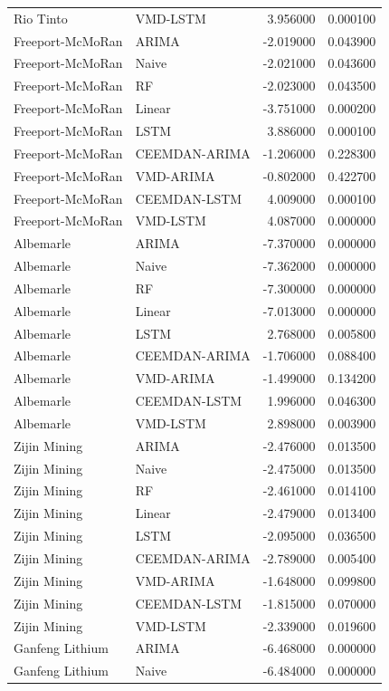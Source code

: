 \begin{longtable}{llrr}
Rio Tinto & VMD-LSTM & 3.956000 & 0.000100 \\
Freeport-McMoRan & ARIMA & -2.019000 & 0.043900 \\
Freeport-McMoRan & Naive & -2.021000 & 0.043600 \\
Freeport-McMoRan & RF & -2.023000 & 0.043500 \\
Freeport-McMoRan & Linear & -3.751000 & 0.000200 \\
Freeport-McMoRan & LSTM & 3.886000 & 0.000100 \\
Freeport-McMoRan & CEEMDAN-ARIMA & -1.206000 & 0.228300 \\
Freeport-McMoRan & VMD-ARIMA & -0.802000 & 0.422700 \\
Freeport-McMoRan & CEEMDAN-LSTM & 4.009000 & 0.000100 \\
Freeport-McMoRan & VMD-LSTM & 4.087000 & 0.000000 \\
Albemarle & ARIMA & -7.370000 & 0.000000 \\
Albemarle & Naive & -7.362000 & 0.000000 \\
Albemarle & RF & -7.300000 & 0.000000 \\
Albemarle & Linear & -7.013000 & 0.000000 \\
Albemarle & LSTM & 2.768000 & 0.005800 \\
Albemarle & CEEMDAN-ARIMA & -1.706000 & 0.088400 \\
Albemarle & VMD-ARIMA & -1.499000 & 0.134200 \\
Albemarle & CEEMDAN-LSTM & 1.996000 & 0.046300 \\
Albemarle & VMD-LSTM & 2.898000 & 0.003900 \\
Zijin Mining & ARIMA & -2.476000 & 0.013500 \\
Zijin Mining & Naive & -2.475000 & 0.013500 \\
Zijin Mining & RF & -2.461000 & 0.014100 \\
Zijin Mining & Linear & -2.479000 & 0.013400 \\
Zijin Mining & LSTM & -2.095000 & 0.036500 \\
Zijin Mining & CEEMDAN-ARIMA & -2.789000 & 0.005400 \\
Zijin Mining & VMD-ARIMA & -1.648000 & 0.099800 \\
Zijin Mining & CEEMDAN-LSTM & -1.815000 & 0.070000 \\
Zijin Mining & VMD-LSTM & -2.339000 & 0.019600 \\
Ganfeng Lithium & ARIMA & -6.468000 & 0.000000 \\
Ganfeng Lithium & Naive & -6.484000 & 0.000000 \\

\end{longtable}
